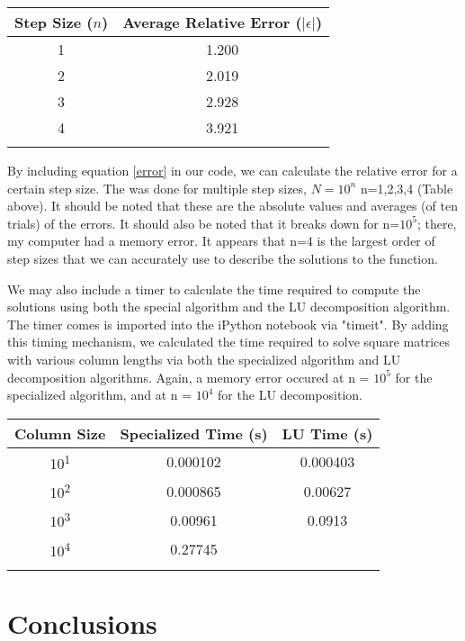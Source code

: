\documentclass[10pt,showpacs,preprintnumbers,footinbib,amsmath,amssymb,aps,prl,twocolumn,groupedaddress,superscriptaddress,showkeys]{revtex4-1}
\begin{document}
\begin{center}
	\begin{tabular}{cc}
		\hline \hline
			Step Size ($n$) &  Average Relative Error ($|\epsilon|$)\\
			\hline
			1 & 1.200\\
			2 & 2.019\\
			3 & 2.928\\
			4 & 3.921\\
			\hline
			\label{errortable}
	\end{tabular}
\end{center}
	
	By including equation \ref{error} in our code, we can calculate the relative error for a certain step size.  The was done for multiple step sizes, $N=10^{n}$ n=1,2,3,4 (Table above).    It should be noted that these are the absolute values and averages (of ten trials) of the errors.  It should also be noted that it breaks down for n=$10^{5}$; there, my computer had a memory error.  It appears that n=4 is the largest order of step sizes that we can accurately use to describe the solutions to the function.
	
	We may also include a timer to calculate the time required to compute the solutions using both the special algorithm and the LU decomposition algorithm. The timer comes is imported into the iPython notebook via "timeit".  By adding this timing mechanism, we calculated the time required to solve square matrices with various column lengths via both the specialized algorithm and LU decomposition algorithms.  Again, a memory error occured at n = $10^{5}$ for the specialized algorithm, and at n = $10^{4}$ for the LU decomposition.
	

	\begin{center}
		\begin{tabular}{ccc}
			\hline \hline
			Column Size & Specialized Time (s) & LU Time (s)\\
			\hline		
			10\textsuperscript{1} & 0.000102      & 0.000403  \\
			10\textsuperscript{2} & 0.000865      &  0.00627 \\
			10\textsuperscript{3} & 0.00961    &  0.0913  \\
			10\textsuperscript{4} & 0.27745   &  \\
			\hline
			\label{timingtable}
		\end{tabular}
	\end{center}
	
	
\section{Conclusions}
\end{document}
